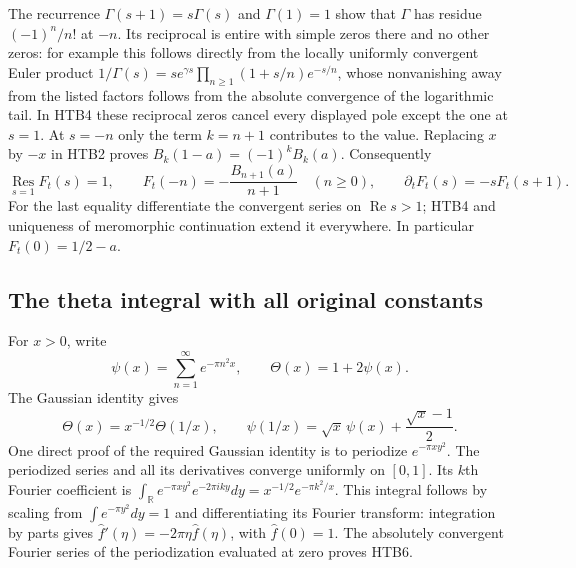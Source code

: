 \documentclass[11pt]{article}
\theoremstyle{definition}
\begin{document}
The recurrence $\Gamma(s+1)=s\Gamma(s)$ and $\Gamma(1)=1$ show that
$\Gamma$ has residue $(-1)^n/n!$ at $-n$. Its reciprocal is entire with
simple zeros there and no other zeros: for example this follows directly
from the locally uniformly convergent Euler product
$1/\Gamma(s)=s e^{\gamma s}\prod_{n\ge1}(1+s/n)e^{-s/n}$, whose
nonvanishing away from the listed factors follows from the absolute
convergence of the logarithmic tail. In HTB4 these reciprocal zeros
cancel every displayed pole except the one at $s=1$. At $s=-n$ only
the term $k=n+1$ contributes to the value. Replacing $x$ by $-x$ in
HTB2 proves $B_k(1-a)=(-1)^k B_k(a)$. Consequently
\begin{equation}\tag{HTB5}
 \operatorname*{Res}_{s=1}F_t(s)=1,\qquad
 F_t(-n)=-\frac{B_{n+1}(a)}{n+1}\quad(n\ge0),\qquad
 \partial_t F_t(s)=-sF_t(s+1).
\end{equation}
For the last equality differentiate the convergent series on
$\operatorname{Re}s>1$; HTB4 and uniqueness of meromorphic continuation
extend it everywhere. In particular $F_t(0)=1/2-a$.

\subsection{The theta integral with all original constants}

For $x>0$, write
\[
 \psi(x)=\sum_{n=1}^{\infty}e^{-\pi n^2x},\qquad
 \Theta(x)=1+2\psi(x).
\]
The Gaussian identity gives
\begin{equation}\tag{HTB6}
 \Theta(x)=x^{-1/2}\Theta(1/x),\qquad
 \psi(1/x)=\sqrt{x}\,\psi(x)+\frac{\sqrt{x}-1}{2}.
\end{equation}
One direct proof of the required Gaussian identity is to periodize
$e^{-\pi x y^2}$. The periodized series and all its derivatives converge
uniformly on $[0,1]$. Its $k$th Fourier coefficient is
$\int_{\mathbb R}e^{-\pi x y^2}e^{-2\pi i k y}dy
=x^{-1/2}e^{-\pi k^2/x}$. This integral follows by scaling from
$\int e^{-\pi y^2}dy=1$ and differentiating its Fourier transform:
integration by parts gives $\widehat f'(\eta)=-2\pi\eta\widehat f(\eta)$,
with $\widehat f(0)=1$. The absolutely convergent Fourier series of the
periodization evaluated at zero proves HTB6.
\end{document}
